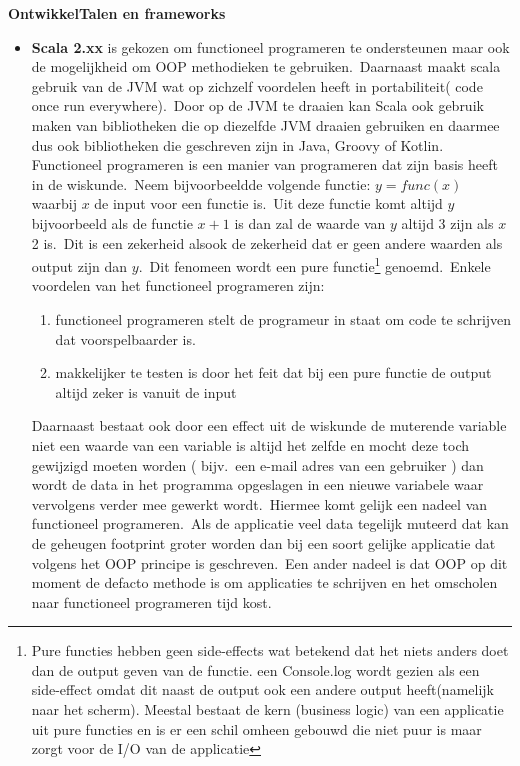 \textbf{OntwikkelTalen en frameworks}
\begin{itemize}
\item \textbf{Scala 2.xx} is gekozen om functioneel programeren te ondersteunen maar ook de mogelijkheid om OOP methodieken te gebruiken.\ Daarnaast maakt scala gebruik van de JVM wat op zichzelf voordelen heeft in portabiliteit( code once run everywhere).\ Door op de JVM te draaien kan Scala ook gebruik maken van bibliotheken die op diezelfde JVM draaien gebruiken en daarmee dus ook bibliotheken die geschreven zijn in Java, Groovy of Kotlin.\\
Functioneel programeren is een manier van programeren dat zijn basis heeft in de wiskunde.\ Neem bijvoorbeeldde volgende functie: \(y = func(x)\) waarbij \(x\) de input voor een functie is.\ Uit deze functie komt altijd \(y\) bijvoorbeeld als de functie \(x+1\) is dan zal de waarde van \(y\) altijd 3 zijn als \(x\) 2 is.\ Dit is een zekerheid alsook de zekerheid dat er geen andere waarden als output zijn dan \(y\).\ Dit fenomeen wordt een pure functie\footnote{Pure functies hebben geen side-effects wat betekend dat het niets anders doet dan de output geven van de functie. een Console.log wordt gezien als een side-effect omdat dit naast de output ook een andere output heeft(namelijk naar het scherm). Meestal bestaat de kern (business logic) van een applicatie uit pure functies en is er een schil omheen gebouwd die niet puur is maar zorgt voor de I/O van de applicatie} genoemd.\ Enkele voordelen van het functioneel programeren zijn:
\begin{enumerate}
  \item functioneel programeren stelt de programeur in staat om code te schrijven dat voorspelbaarder is.
  \item makkelijker te testen is door het feit dat bij een pure functie de output altijd zeker is vanuit de input
\end{enumerate}
Daarnaast bestaat ook door een effect uit de wiskunde de muterende variable niet een waarde van een variable is altijd het zelfde en mocht deze toch gewijzigd moeten worden ( bijv.\ een e-mail adres van een gebruiker ) dan wordt de data in het programma opgeslagen in een nieuwe variabele waar vervolgens verder mee gewerkt wordt.\ Hiermee komt gelijk een nadeel van functioneel programeren.\ Als de applicatie veel data tegelijk muteerd dat kan de geheugen footprint groter worden dan bij een soort gelijke applicatie dat volgens het OOP principe is geschreven.\ Een ander nadeel is dat OOP op dit moment de defacto methode is om applicaties te schrijven en het omscholen naar functioneel programeren tijd kost.


\end{itemize}
